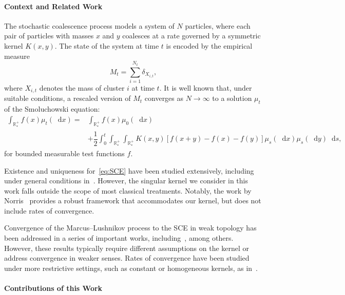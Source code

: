 \documentclass[11pt,a4paper]{article}
\newcommand{\RRP}{\mathbb{R}^+_*}
\newcommand{\dd}{\mathop{}\!\mathrm{d}}
\begin{document}
\paragraph{Context and Related Work}

The stochastic coalescence process models a system of $N$ particles, where each pair of particles with masses $x$ and $y$ coalesces at a rate governed by a symmetric kernel $K(x,y)$. The state of the system at time $t$ is encoded by the empirical measure
\[
    M_t = \sum_{i=1}^{N_t} \delta_{X_{i,t}},
\]
where $X_{i,t}$ denotes the mass of cluster $i$ at time $t$. It is well known that, under suitable conditions, a rescaled version of $M_t$ converges as $N \to \infty$ to a solution $\mu_t$ of the Smoluchowski equation:
\begin{equation}\label{eq:SCE}
    \begin{aligned}
    \int_{\RRP} f(x)\mu_t (\dd x) =& \int_{\RRP} f(x)\mu_0 (\dd x)\\
     &+ \dfrac12\int_0^t \int_{\RRP}\int_{\RRP} 
        K(x,y)\left[f(x+y) - f(x) - f(y)\right] \mu_s(\dd x)\mu_s(\dd y) \dd s,
    \end{aligned}
\end{equation}
for bounded measurable test functions $f$.

Existence and uniqueness for~\eqref{eq:SCE} have been studied extensively, including under general conditions in~\cite{laurencotClassContinuousCoagulationFragmentation2000,lambExistenceUniquenessResults2004}. However, the singular kernel we consider in this work falls outside the scope of most classical treatments. Notably, the work by Norris~\cite{norrisSmoluchowskisCoagulationEquation1999} provides a robust framework that accommodates our kernel, but does not include rates of convergence.

Convergence of the Marcus–Lushnikov process to the SCE in weak topology has been addressed in a series of important works, including~\cite{fournierConvergenceMarcusLushnikov2004,fournierStochasticCoalescenceHomogeneouslike2009,fournierDistanceCoagulation2006}, among others. However, these results typically require different assumptions on the kernel or address convergence in weaker senses. Rates of convergence have been studied under more restrictive settings, such as constant or homogeneous kernels, as in~\cite{cepedaSmoluchowskisEquationRate2011a,kyprianouUniversalityClassFragmentationcoalescence2018}.

\paragraph{Contributions of this Work}
\end{document}
